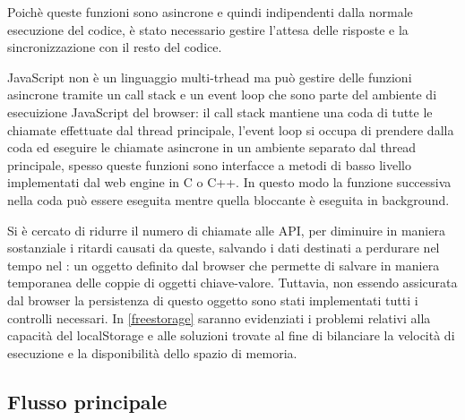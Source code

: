 Poichè queste funzioni sono asincrone e quindi indipendenti dalla normale esecuzione del codice, è stato necessario gestire l'attesa delle risposte e la sincronizzazione con il resto del codice.

JavaScript non è un linguaggio multi-trhead ma può gestire delle funzioni asincrone tramite un call stack e un event loop che sono parte del ambiente di esecuizione JavaScript del browser: il call stack mantiene una coda di tutte le chiamate effettuate dal thread principale, l'event loop si occupa di prendere dalla coda ed eseguire le chiamate asincrone in un ambiente separato dal thread principale, spesso queste funzioni sono interfacce a metodi di basso livello implementati dal web engine in C o C++. In questo modo la funzione successiva nella coda può essere eseguita mentre quella bloccante è eseguita in background. 




Si è cercato di ridurre il numero di chiamate alle API, per diminuire in maniera sostanziale i ritardi causati da queste, salvando i dati destinati a perdurare nel tempo nel : un oggetto definito dal browser che permette di salvare in maniera temporanea delle coppie di oggetti chiave-valore. Tuttavia, non essendo assicurata dal browser la persistenza di questo oggetto sono stati implementati tutti i controlli necessari. In \ref*{freestorage} saranno evidenziati i problemi relativi alla capacità del localStorage e alle soluzioni trovate al fine di bilanciare la velocità di esecuzione e la disponibilità dello spazio di memoria.

\subsection{Flusso principale}\label{flusso_principale}

